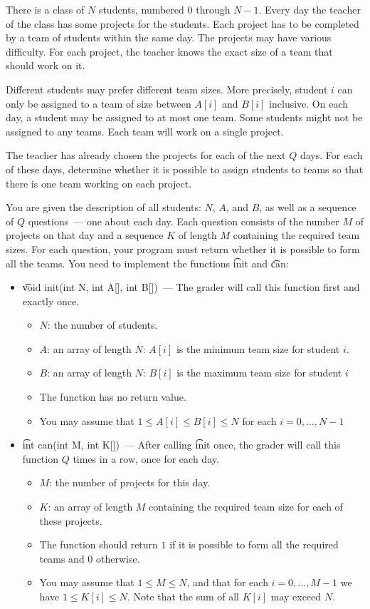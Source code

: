 There is a class of $N$ students, numbered $0$ through $N - 1$. Every day the teacher of the class has some projects for the students. Each project has to be completed by a team of students within the same day. The projects may have various difficulty. For each project, the teacher knows the exact size of a team that should work on it.

Different students may prefer different team sizes. More precisely, student $i$ can only be assigned to a team of size between $A[i]$ and $B[i]$ inclusive. On each day, a student may be assigned to at most one team. Some students might not be assigned to any teams. Each team will work on a single project.

The teacher has already chosen the projects for each of the next $Q$ days. For each of these days, determine whether it is possible to assign students to teams so that there is one team working on each project.

You are given the description of all students: $N$, $A$, and $B$, as well as a sequence of $Q$ questions~--- one about each day. Each question consists of the number $M$ of projects on that day and a sequence $K$
of length $M$ containing the required team sizes. For each question, your program must return whether it is possible to form all the teams.
You need to implement the functions \t{init} and \t{can}:
\begin{itemize}
\item \t{void init(int N, int A[], int B[])}~--- The grader will call this function first and exactly once.
\begin{itemize}
\item $N$: the number of students.
\item $A$: an array of length $N$: $A[i]$ is the minimum team size for student $i$.
\item $B$: an array of length $N$: $B[i]$ is the maximum team size for student $i$
\item The function has no return value.
\item You may assume that $1 \le A[i] \le B[i] \le N$ for each $i = 0, \ldots, N - 1$
\end{itemize}
\item \t{int can(int M, int K[])}~--- After calling \t{init} once, the grader will call this function $Q$ times in a row, once for each day.
\begin{itemize}
\item $M$: the number of projects for this day.
\item $K$: an array of length $M$ containing the required team size for each of these projects.
\item The function should return $1$ if it is possible to form all the required teams and $0$ otherwise.
\item You may assume that $1 \le M \le N$, and that for each $i = 0, \ldots, M - 1$ we have $1 \le K[i] \le N$. Note that the sum of all $K[i]$ may exceed $N$.
\end{itemize}
\end{itemize}